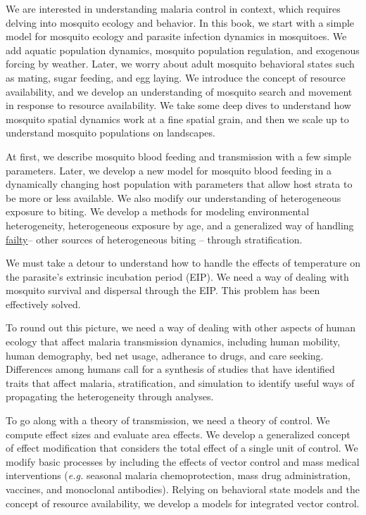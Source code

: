 \documentclass[
]{book}
\begin{document}
We are interested in understanding malaria control in context, which requires delving into mosquito ecology and behavior. In this book, we start with a simple model for mosquito ecology and parasite infection dynamics in mosquitoes. We add aquatic population dynamics, mosquito population regulation, and exogenous forcing by weather. Later, we worry about adult mosquito behavioral states such as mating, sugar feeding, and egg laying. We introduce the concept of resource availability, and we develop an understanding of mosquito search and movement in response to resource availability. We take some deep dives to understand how mosquito spatial dynamics work at a fine spatial grain, and then we scale up to understand mosquito populations on landscapes.

At first, we describe mosquito blood feeding and transmission with a few simple parameters. Later, we develop a new model for mosquito blood feeding in a dynamically changing host population with parameters that allow host strata to be more or less available. We also modify our understanding of heterogeneous exposure to biting. We develop a methods for modeling environmental heterogeneity, heterogeneous exposure by age, and a generalized way of handling \href{Frailty}{failty}-- other sources of heterogeneous biting -- through stratification.

We must take a detour to understand how to handle the effects of temperature on the parasite's extrinsic incubation period (EIP). We need a way of dealing with mosquito survival and dispersal through the EIP. This problem has been effectively solved.

To round out this picture, we need a way of dealing with other aspects of human ecology that affect malaria transmission dynamics, including human mobility, human demography, bed net usage, adherance to drugs, and care seeking. Differences among humans call for a synthesis of studies that have identified traits that affect malaria, stratification, and simulation to identify useful ways of propagating the heterogeneity through analyses.

To go along with a theory of transmission, we need a theory of control. We compute effect sizes and evaluate area effects. We develop a generalized concept of effect modification that considers the total effect of a single unit of control. We modify basic processes by including the effects of vector control and mass medical interventions (\emph{e.g.} seasonal malaria chemoprotection, mass drug administration, vaccines, and monoclonal antibodies). Relying on behavioral state models and the concept of resource availability, we develop a models for integrated vector control.
\end{document}
